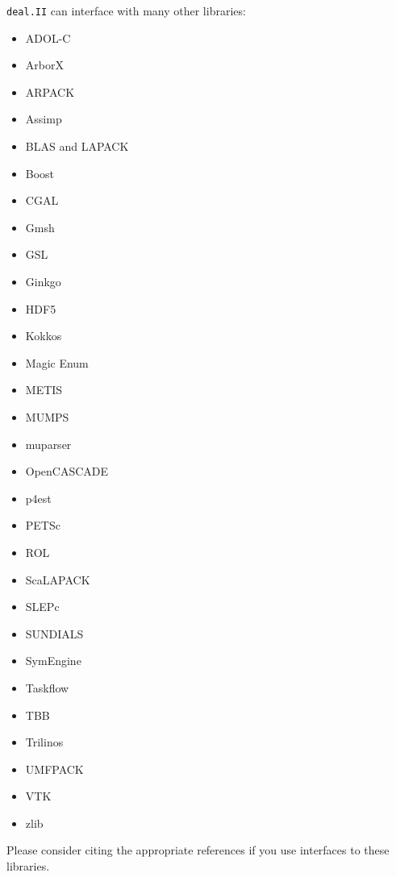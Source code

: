 \documentclass{ansarticle-preprint}
\newcommand{\specialword}[1]{\texttt{#1}}
\newcommand{\dealii}{{\specialword{deal.II}}\xspace}
\begin{document}
\dealii can interface with many other libraries:
\begin{multicols}{3}
  \begin{itemize}[leftmargin=4mm]
    \item ADOL-C \cite{griewank1996adolc}
    \item ArborX \cite{prokopenko2025}
    \item ARPACK \cite{lehoucq1998arpack}
    \item Assimp \cite{schulze2021assimp}
    \item BLAS and LAPACK \cite{anderson1999lapack}
    \item Boost \cite{boost-web-page}
    \item CGAL \cite{cgal:eb-24b}
    \item Gmsh \cite{geuzaine2009gmsh}
    \item GSL \cite{galassi2009gsl,gsl-web-page}
    \item Ginkgo \cite{anzt2020ginkgo,anzt2022ginkgo}
    \item HDF5 \cite{hdf5-web-page}
    \item Kokkos \cite{trott2022}
    \item Magic Enum \cite{magic-enum-web-page}
    \item METIS \cite{karypis1998metis}
    \item MUMPS \cite{amestoy2001mumps,amestoy2019mumps}
    \item muparser \cite{muparser-web-page}
    \item OpenCASCADE \cite{opencascade-web-page}
    \item p4est \cite{burstedde2011p4est}
    \item PETSc \cite{petsc-user-ref,petsc-web-page}
    \item ROL \cite{ridzal2014rol}
    \item ScaLAPACK \cite{blackford1997scalapack}
    \item SLEPc \cite{roman2023improvements}
    \item SUNDIALS \cite{gardner2022enabling}
    \item SymEngine \cite{symengine-web-page}
    \item Taskflow \cite{huang2021taskflow}
    \item TBB \cite{reinders2007tbb}
    \item Trilinos \cite{mayr2025trilinos,trilinos-web-page}
    \item UMFPACK \cite{davis2004umfpack}
    \item VTK \cite{vtk-web-page}
    \item zlib \cite{zlib-web-page}
  \end{itemize}
\end{multicols}
Please consider citing the appropriate references if you use
interfaces to these libraries.
\end{document}
